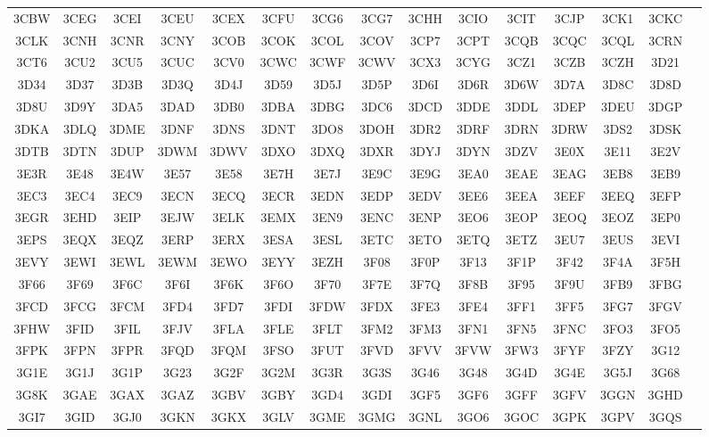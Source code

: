 \begin{longtable}{ c c c c c c c c c c c c c c c }
	3CBW & 3CEG & 3CEI & 3CEU & 3CEX & 3CFU & 3CG6 & 3CG7 & 3CHH & 3CIO & 3CIT & 3CJP & 3CK1 & 3CKC  \\
	3CLK & 3CNH & 3CNR & 3CNY & 3COB & 3COK & 3COL & 3COV & 3CP7 & 3CPT & 3CQB & 3CQC & 3CQL & 3CRN  \\
	3CT6 & 3CU2 & 3CU5 & 3CUC & 3CV0 & 3CWC & 3CWF & 3CWV & 3CX3 & 3CYG & 3CZ1 & 3CZB & 3CZH & 3D21  \\
	3D34 & 3D37 & 3D3B & 3D3Q & 3D4J & 3D59 & 3D5J & 3D5P & 3D6I & 3D6R & 3D6W & 3D7A & 3D8C & 3D8D  \\
	3D8U & 3D9Y & 3DA5 & 3DAD & 3DB0 & 3DBA & 3DBG & 3DC6 & 3DCD & 3DDE & 3DDL & 3DEP & 3DEU & 3DGP  \\
	3DKA & 3DLQ & 3DME & 3DNF & 3DNS & 3DNT & 3DO8 & 3DOH & 3DR2 & 3DRF & 3DRN & 3DRW & 3DS2 & 3DSK  \\
	3DTB & 3DTN & 3DUP & 3DWM & 3DWV & 3DXO & 3DXQ & 3DXR & 3DYJ & 3DYN & 3DZV & 3E0X & 3E11 & 3E2V  \\
	3E3R & 3E48 & 3E4W & 3E57 & 3E58 & 3E7H & 3E7J & 3E9C & 3E9G & 3EA0 & 3EAE & 3EAG & 3EB8 & 3EB9  \\
	3EC3 & 3EC4 & 3EC9 & 3ECN & 3ECQ & 3ECR & 3EDN & 3EDP & 3EDV & 3EE6 & 3EEA & 3EEF & 3EEQ & 3EFP  \\
	3EGR & 3EHD & 3EIP & 3EJW & 3ELK & 3EMX & 3EN9 & 3ENC & 3ENP & 3EO6 & 3EOP & 3EOQ & 3EOZ & 3EP0  \\
	3EPS & 3EQX & 3EQZ & 3ERP & 3ERX & 3ESA & 3ESL & 3ETC & 3ETO & 3ETQ & 3ETZ & 3EU7 & 3EUS & 3EVI  \\
	3EVY & 3EWI & 3EWL & 3EWM & 3EWO & 3EYY & 3EZH & 3F08 & 3F0P & 3F13 & 3F1P & 3F42 & 3F4A & 3F5H  \\
	3F66 & 3F69 & 3F6C & 3F6I & 3F6K & 3F6O & 3F70 & 3F7E & 3F7Q & 3F8B & 3F95 & 3F9U & 3FB9 & 3FBG  \\
	3FCD & 3FCG & 3FCM & 3FD4 & 3FD7 & 3FDI & 3FDW & 3FDX & 3FE3 & 3FE4 & 3FF1 & 3FF5 & 3FG7 & 3FGV  \\
	3FHW & 3FID & 3FIL & 3FJV & 3FLA & 3FLE & 3FLT & 3FM2 & 3FM3 & 3FN1 & 3FN5 & 3FNC & 3FO3 & 3FO5  \\
	3FPK & 3FPN & 3FPR & 3FQD & 3FQM & 3FSO & 3FUT & 3FVD & 3FVV & 3FVW & 3FW3 & 3FYF & 3FZY & 3G12  \\
	3G1E & 3G1J & 3G1P & 3G23 & 3G2F & 3G2M & 3G3R & 3G3S & 3G46 & 3G48 & 3G4D & 3G4E & 3G5J & 3G68  \\
	3G8K & 3GAE & 3GAX & 3GAZ & 3GBV & 3GBY & 3GD4 & 3GDI & 3GF5 & 3GF6 & 3GFF & 3GFV & 3GGN & 3GHD  \\
	3GI7 & 3GID & 3GJ0 & 3GKN & 3GKX & 3GLV & 3GME & 3GMG & 3GNL & 3GO6 & 3GOC & 3GPK & 3GPV & 3GQS  \\

\end{longtable}

